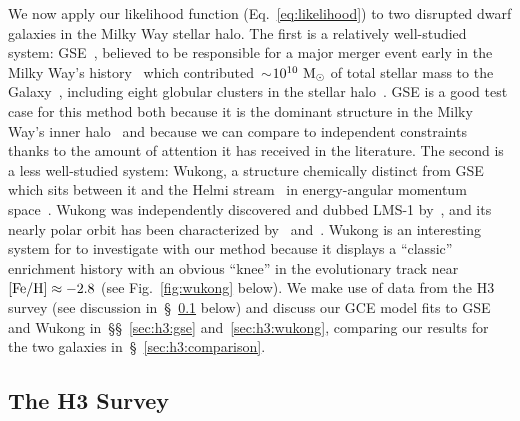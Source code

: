 \documentclass[ms.tex]{subfiles}
\begin{document}
We now apply our likelihood function (Eq.~\ref{eq:likelihood}) to two
disrupted dwarf galaxies in the Milky Way stellar halo.
The first is a relatively well-studied system: GSE~\citep{Belokurov2018,
Helmi2018}, believed to be responsible for a major merger event early in the
Milky Way's history~\citep{Chaplin2020} which contributed~$\sim$$10^{10}~\text{M}_\odot$
of total stellar mass to the Galaxy~\citep{Deason2019, Fattahi2019,
Mackereth2019, Vincenzo2019, Han2022}, including eight globular clusters in the
stellar halo~\citep{Myeong2018}.
GSE is a good test case for this method both because it is the dominant
structure in the Milky Way's inner halo~\citep{Helmi2018} and because we can
compare to independent constraints thanks to the amount of attention it has
received in the literature.
The second is a less well-studied system: Wukong, a structure chemically
distinct from GSE which sits between it and the Helmi stream~\citep{Helmi1999}
in energy-angular momentum space~\citep{Naidu2020, Naidu2022}.
Wukong was independently discovered and dubbed LMS-1 by~\citet{Yuan2020},
and its nearly polar orbit has been characterized by~\citet{Malhan2021,
Malhan2022} and~\citet{Shank2022}.
Wukong is an interesting system for to investigate with our method because it
displays a ``classic'' enrichment history with an obvious ``knee'' in the
evolutionary track near~$\text{[Fe/H]} \approx -2.8$ (see Fig.~\ref{fig:wukong} below).
We make use of data from the H3 survey (see discussion
in~\S~\ref{sec:h3:survey} below) and discuss our GCE model fits to GSE and
Wukong in~\S\S~\ref{sec:h3:gse} and~\ref{sec:h3:wukong}, comparing our results
for the two galaxies in~\S~\ref{sec:h3:comparison}.

\subsection{The H3 Survey}
\label{sec:h3:survey}
\end{document}

